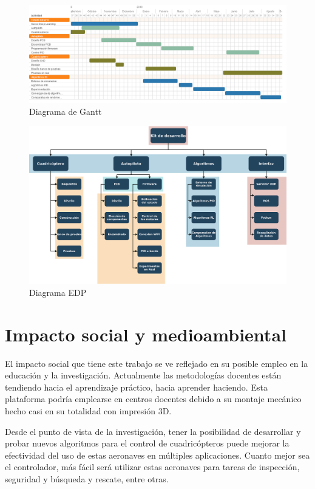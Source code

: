 \begin{figure}[htb!]
	\centering
	\includegraphics[width=\textwidth]{planificacion_ambiental/gantt}
	\caption{Diagrama de Gantt}
	\label{gantt}	
\end{figure}

\begin{figure}[htb!]
	\centering
	\includegraphics[width=\textwidth]{planificacion_ambiental/edp}
	\caption{Diagrama EDP}
	\label{EDP}	
\end{figure}



\chapter{Impacto social y medioambiental}

El impacto social que tiene este trabajo se ve reflejado en su posible empleo en la educación y la investigación. Actualmente las metodologías docentes están tendiendo hacia el aprendizaje práctico, hacia aprender haciendo. Esta plataforma podría emplearse en centros docentes debido a su montaje mecánico hecho casi en su totalidad con impresión 3D.

Desde el punto de vista de la investigación, tener la posibilidad de desarrollar y probar nuevos algoritmos para el control de cuadricópteros puede mejorar la efectividad del uso de estas aeronaves en múltiples aplicaciones. Cuanto mejor sea el controlador, más fácil será utilizar estas aeronaves para tareas de inspección, seguridad y búsqueda y rescate, entre otras.

